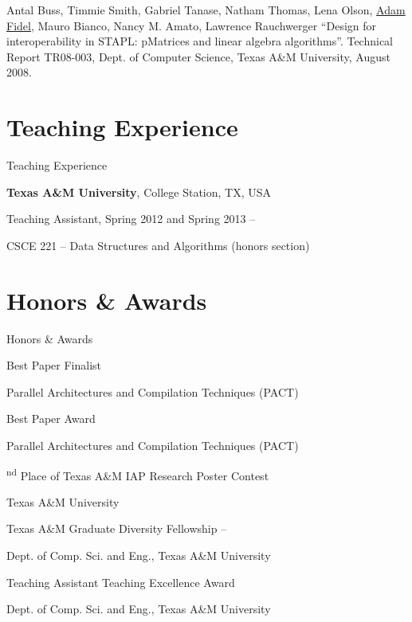 \documentclass[a4paper,10pt,oneside]{article}
\begin{document}
\begin{body}
\EntryGap


{Antal Buss, Timmie Smith, Gabriel Tanase, Natham Thomas, Lena Olson, \underline{Adam Fidel}, Mauro Bianco, Nancy M. Amato, Lawrence Rauchwerger ``Design for interoperability in STAPL: pMatrices and linear algebra algorithms''. Technical Report TR08-003, Dept. of Computer Science, Texas A\&M University, August 2008.}


\section{Teaching Experience}
{Teaching Experience}

{\textbf{Texas A\&M University}},
College Station, TX, USA
\par
Teaching Assistant, Spring 2012 and Spring 2013
\hfill
{} --
\begin{detail}
CSCE 221 -- Data Structures and Algorithms (honors section)
\end{detail}




\section{Honors \& Awards}
{Honors\newline
\& Awards}

Best Paper Finalist
\hfill
{}
\par
Parallel Architectures and Compilation Techniques (PACT)

\EntryGap
Best Paper Award
\hfill
{}
\par
Parallel Architectures and Compilation Techniques (PACT)

\textsuperscript{nd} Place of Texas A\&M IAP Research Poster Contest
\hfill
{}
\par
Texas A\&M University

\EntryGap
Texas A\&M Graduate Diversity Fellowship
\hfill
{}--
\par
Dept. of Comp. Sci. and Eng., Texas A\&M University

\EntryGap
Teaching Assistant Teaching Excellence Award
\hfill
{}
\par
Dept. of Comp. Sci. and Eng., Texas A\&M University


\end{body}
\end{document}
